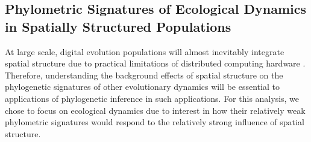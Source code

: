 

\subsection{Phylometric Signatures of Ecological Dynamics in Spatially Structured Populations}



At large scale, digital evolution populations will almost inevitably integrate spatial structure due to practical limitations of distributed computing hardware \citep{ackley2014indefinitely}.
Therefore, understanding the background effects of spatial structure on the phylogenetic signatures of other evolutionary dynamics will be essential to applications of phylogenetic inference in such applications.
For this analysis, we chose to focus on ecological dynamics due to interest in how their relatively weak phylometric signatures would respond to the relatively strong influence of spatial structure.


